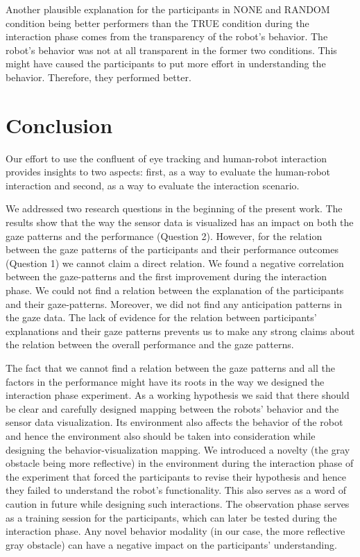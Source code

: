 \documentclass{sig-alternate}
\begin{document}
Another plausible explanation for the participants in NONE and RANDOM condition
being better performers than the TRUE condition during the interaction phase
comes from the transparency of the robot's behavior. The robot's
behavior was not at all transparent in the former two conditions. This might
have caused the participants to put more effort in understanding the behavior.
Therefore, they performed better.


\section{Conclusion}

Our effort to use the confluent of eye tracking and human-robot
interaction provides insights to two aspects: first, as a way to
evaluate the human-robot interaction and second, as a way to evaluate
the interaction scenario.

We addressed two research questions in the beginning of the present
work. The results show that the way the sensor data is visualized has an
impact on both the gaze patterns and the performance (Question 2).
However, for the relation between the gaze patterns of the participants
and their performance outcomes (Question 1) we cannot claim a direct
relation. We found a negative correlation between the gaze-patterns and
the first improvement during the interaction phase. We could not find a
relation between the explanation of the participants and their
gaze-patterns. Moreover, we did not find any anticipation patterns in
the gaze data. The lack of evidence for the relation between
participants' explanations and their gaze patterns prevents us to make
any strong claims about the relation between the overall performance and
the gaze patterns.

The fact that we cannot find a relation between the gaze patterns and
all the factors in the performance might have its roots in the way we
designed the interaction phase experiment. As a working hypothesis we
said that there should be clear and carefully designed mapping between
the robots' behavior and the sensor data visualization. Its environment
also affects the behavior of the robot and hence the environment also
should be taken into consideration while designing the
behavior-visualization mapping. We introduced a novelty (the gray
obstacle being more reflective) in the environment during the
interaction phase of the experiment that forced the participants to
revise their hypothesis and hence they failed to understand the robot's
functionality. This also serves as a word of caution in future while
designing such interactions. The observation phase serves as a training
session for the participants, which can later be tested during the
interaction phase. Any novel behavior modality (in our case, the more
reflective gray obstacle) can have a negative impact on the
participants' understanding.
\end{document}
